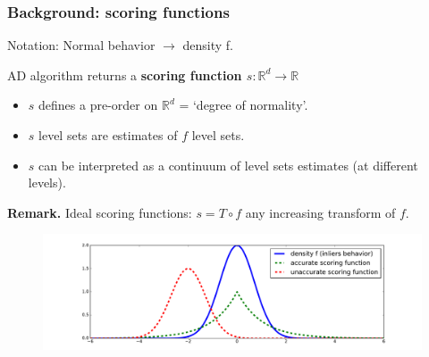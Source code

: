\documentclass[9pt]{beamer}
\newcommand\blue{\color{blue} }
\newcommand\green{\color{green} }
\begin{document}
\begin{frame}
\begin{itemize}

\end{itemize}
\end{frame}


\begin{frame}
\frametitle{Background: scoring functions}

Notation: Normal behavior $\to$ density {\blue f}.
\begin{block}{AD algorithm returns a \textbf{scoring function {\green $s: \mathbb{R}^d \to \mathbb{R}$}}}

\begin{itemize}
\item {\green $s$} defines a {\green pre-order} on $\mathbb{R}^d$ = `degree of normality'.\\
\item {\green $s$} level sets are estimates of {\blue $f$} level sets.\\
\item {\green $s$} can be interpreted as a {\green continuum of level sets estimates} (at different levels).
\end{itemize}
\end{block}
{\small
\textbf{Remark.} Ideal scoring functions: %
{\green $s=T \circ f$} any increasing transform of $f$.
}
%
\begin{figure}[htb]
\centering
\includegraphics[width=1.01\columnwidth]{sourcefigs/scoring.pdf}
\end{figure}

\end{frame}
\end{document}
